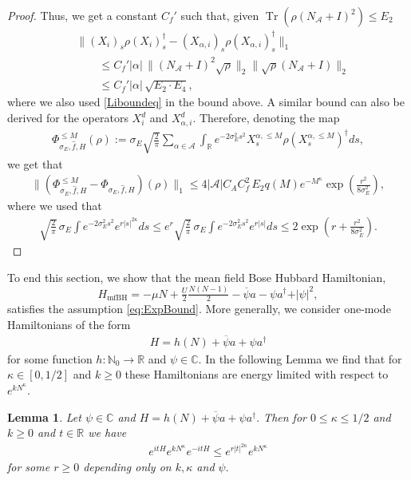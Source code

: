 \documentclass[11pt]{amsart}
\newcommand{\1}{\mathbbm{1}}
\newcommand{\Tr}{\operatorname{Tr}}
\newcommand{\R}{\mathbb{R}}
\newcommand{\C}{\mathbb{C}}
\newcommand{\N}{\mathbb{N}}
\newcommand{\NA}{N_{\mathcal{A}}}
\newcommand{\cA}{\mathcal{A}}
\theoremstyle{plain}
\newtheorem{lemma}[theorem]{Lemma}
\theoremstyle{definition}
\theoremstyle{remark}
\numberwithin{equation}{section}
\begin{document}
\begin{proof}
{Thus, we get a constant $C_f'$ such that, given $\Tr(\rho (\NA+I)^2)\le E_2$
\begin{align*}
&\|(X_{i})_s\rho (X_{i})_s^\dagger-(X_{\alpha,i})_s\rho(X_{\alpha,i})^\dagger_s\|_1\\
& \qquad\le C_f'|\alpha|\,\|(\NA+I)^2\sqrt{\rho}\|_2\|\sqrt{\rho}(\NA+I)\|_2\\
&\qquad \le C_f'|\alpha| \,\sqrt{E_2\cdot E_4},
\end{align*}
where we also used \eqref{Liboundeq} in the bound above. A similar bound can also be derived for the operators $X_{i}^d$ and $X_{\alpha,i}^d$.}
Therefore, denoting the map
\begin{align}\label{phialphasigmaEmapTrunc}
\Phi^{\le M}_{\sigma_E,\widehat f,H}(\rho):=\sigma_E\sqrt{\frac{2}{\pi}}\sum_{\alpha\in\cA}\int_{\mathbb{R}}e^{-2\sigma_E^2 s^2}X^{\alpha,\le M}_s \rho (X^{\alpha,\le M}_s)^\dagger ds,
\end{align}
 we get that
\begin{align*}
\|(\Phi^{\le M}_{\sigma_E,\widehat f,H}-\Phi_{\sigma_E,\widehat{f},H})(\rho)\|_1\le 4 |\cA| C_AC^2_f\,E_2 q(M)e^{-M^{\kappa}}\exp\left(\tfrac{r^2}{8\sigma^2_E}\right), 
\end{align*}
where we used that  
\begin{align*}
  \sqrt{\frac{2}{\pi}}\,\sigma_E\int e^{-2\sigma^2_Es^2} e^{r|s|^{2\kappa}}ds\le e^{r} \sqrt{\frac{2}{\pi}}\,\sigma_E\int e^{-2\sigma^2_Es^2} e^{r|s|}ds\le 2\exp\left(r+\tfrac{r^2}{8\sigma^2_E}\right).
\end{align*}

\end{proof}
To end this section, we show that the mean field Bose Hubbard Hamiltonian, $$H_{\text{mfBH}}= -\mu N +\tfrac{U}{2} \tfrac{N(N-1)}{2} -\overline{\psi} a - \psi a^\dagger  + \vert \psi \vert^2,$$ satisfies the assumption \eqref{eq:ExpBound}. More generally, we consider one-mode Hamiltonians of the form
\begin{align*}
    H= h(N) + \overline{\psi} a + \psi a^\dagger
\end{align*}
for some function $h: \N_0 \to \R$ and $\psi\in\C.$  In the following Lemma we find that for $\kappa \in[0,1/2]$ and $k\ge 0$ these Hamiltonians are energy limited with respect to  $e^{kN^{\kappa}}.$  
\begin{lemma}
\label{lem:mfBHEnergyLimited}
Let $\psi \in\C$ and $H = h(N)+ \overline{\psi} a + \psi a^\dagger.$
Then for $0\le \kappa\le 1/2$ and $k\ge 0$ and $t\in\R$ we have
\begin{align}
    e^{itH} e^{kN^{\kappa}}e^{-itH} \le e^{r|t|^{2\kappa}}  e^{kN^\kappa}
\end{align}
for some $r\ge 0$ depending only on $k,\kappa$ and $\psi.$
\end{lemma}
\end{document}
